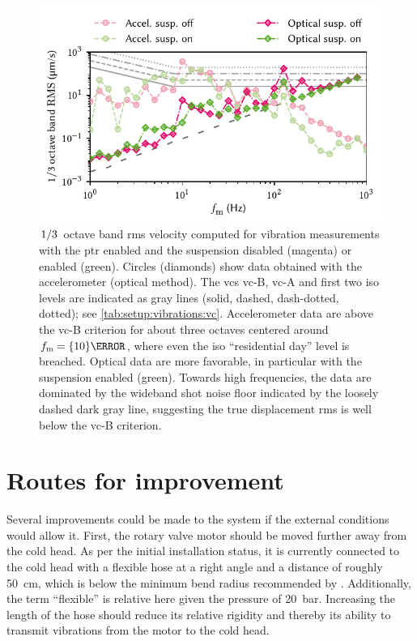 \begin{figure}
    \centering
    \includegraphics{img/pdf/setup/vc}
    \caption[]{
        $\flatfrac{1}{3}$ octave band \gls{rms} velocity computed for vibration measurements with the \gls{ptr} enabled and the suspension disabled (magenta) or enabled (green).
        Circles (diamonds) show data obtained with the accelerometer (optical method).
        The \glspl{vc} \acrshort{vc}-B, \acrshort{vc}-A and first two \acrshort{iso} levels are indicated as gray lines (solid, dashed, dash-dotted, dotted); see \cref{tab:setup:vibrations:vc}.
        Accelerometer data are above the \acrshort{vc}-B criterion for about three octaves centered around $f_{\mr{m}}=\qty{10}{\hertz}$, where even the \acrshort{iso} \enquote{residential day} level is breached.
        Optical data are more favorable, in particular with the suspension enabled (green).
        Towards high frequencies, the data are dominated by the wideband shot noise floor indicated by the loosely dashed dark gray line, suggesting the true displacement \gls{rms} is well below the \acrshort{vc}-B criterion.
    }
    \label{fig:setup:vibrations:vc}
\end{figure}

\section{Routes for improvement}\label{sec:setup:vibrations:outlook}
Several improvements could be made to the system if the external conditions would allow it.
First, the rotary valve motor should be moved further away from the cold head.
As per the initial installation status, it is currently connected to the cold head with a flexible hose at a right angle and a distance of roughly \qty{50}{\cm}, which is below the minimum bend radius recommended by \oxinst.
Additionally, the term \enquote{flexible} is relative here given the pressure of \qty{20}{\bar}.
Increasing the length of the hose should reduce its relative rigidity and thereby its ability to transmit vibrations from the motor to the cold head.


